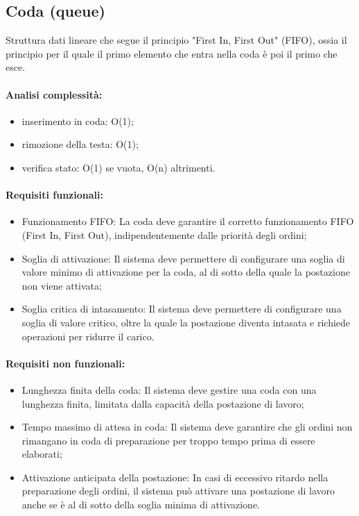 \subsection*{Coda (queue)}
Struttura dati lineare che segue il principio "First In, First Out" (FIFO), ossia il principio per il quale il primo elemento che entra nella coda è poi il primo che esce.
\paragraph{Analisi complessità:}
\begin{itemize}
	\item inserimento in coda: O(1);
	\item rimozione della testa: O(1);
	\item verifica stato: O(1) se vuota, O(n) altrimenti.
\end{itemize}

\paragraph{Requisiti funzionali:}
\begin{itemize}
	\item Funzionamento FIFO: La coda deve garantire il corretto funzionamento FIFO (First In, First Out), indipendentemente dalle priorità degli ordini;
	\item Soglia di attivazione: Il sistema deve permettere di configurare una soglia di valore minimo di attivazione per la coda, al di sotto della quale la postazione non viene attivata;
	\item Soglia critica di intasamento: Il sistema deve permettere di configurare una soglia di valore critico, oltre la quale la postazione diventa intasata e richiede operazioni per ridurre il carico.
\end{itemize}

\paragraph{Requisiti non funzionali:}
\begin{itemize}
	\item Lunghezza finita della coda: Il sistema deve gestire una coda con una lunghezza finita, limitata dalla capacità della postazione di lavoro;
	\item Tempo massimo di attesa in coda: Il sistema deve garantire che gli ordini non rimangano in coda di preparazione per troppo tempo prima di essere elaborati;
	\item Attivazione anticipata della postazione: In casi di eccessivo ritardo nella preparazione degli ordini, il sistema può attivare una postazione di lavoro anche se è al di sotto della soglia minima di attivazione.
\end{itemize}

